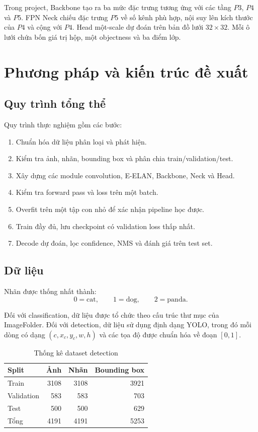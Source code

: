 \documentclass[12pt,a4paper]{article}
\begin{document}
Trong project, Backbone tạo ra ba mức đặc trưng tương ứng với các tầng $P3$, $P4$ và $P5$. FPN Neck chiếu đặc trưng $P5$ về số kênh phù hợp, nội suy lên kích thước của $P4$ và cộng với $P4$. Head một-scale dự đoán trên bản đồ lưới $32\times32$. Mỗi ô lưới chứa bốn giá trị hộp, một objectness và ba điểm lớp.

\section{Phương pháp và kiến trúc đề xuất}

\subsection{Quy trình tổng thể}

Quy trình thực nghiệm gồm các bước:
\begin{enumerate}[leftmargin=*]
  \item Chuẩn hóa dữ liệu phân loại và phát hiện.
  \item Kiểm tra ảnh, nhãn, bounding box và phân chia train/validation/test.
  \item Xây dựng các module convolution, E-ELAN, Backbone, Neck và Head.
  \item Kiểm tra forward pass và loss trên một batch.
  \item Overfit trên một tập con nhỏ để xác nhận pipeline học được.
  \item Train đầy đủ, lưu checkpoint có validation loss thấp nhất.
  \item Decode dự đoán, lọc confidence, NMS và đánh giá trên test set.
\end{enumerate}

\subsection{Dữ liệu}

Nhãn được thống nhất thành:
\[
0=\text{cat},\qquad 1=\text{dog},\qquad 2=\text{panda}.
\]

Đối với classification, dữ liệu được tổ chức theo cấu trúc thư mục của ImageFolder. Đối với detection, dữ liệu sử dụng định dạng YOLO, trong đó mỗi dòng có dạng $(c,x_c,y_c,w,h)$ và các tọa độ được chuẩn hóa về đoạn $[0,1]$.

\begin{table}[H]
\centering
\caption{Thống kê dataset detection}
\begin{tabular}{lrrr}
\toprule
\textbf{Split} & \textbf{Ảnh} & \textbf{Nhãn} & \textbf{Bounding box}\\
\midrule
Train & 3108 & 3108 & 3921\\
Validation & 583 & 583 & 703\\
Test & 500 & 500 & 629\\
\midrule
Tổng & 4191 & 4191 & 5253\\
\bottomrule
\end{tabular}
\end{table}
\end{document}
